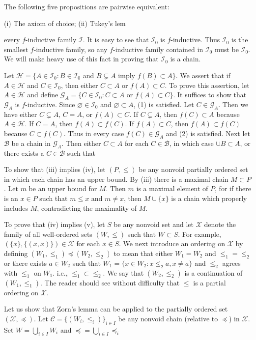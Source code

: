 The following five propositions are pairwise equivalent:

(i) The axiom of choice;
(ii) Tukey’s lem

every $f$-inductive family $\mathcal{I}$. It is easy to see that $\mathcal{I}_0$ is $f$-inductive. Thus $\mathcal{I}_0$ is the smallest $f$-inductive family, so any $f$-inductive family contained in $\mathcal{I}_0$ must be $\mathcal{I}_0$. We will make heavy use of this fact in proving that $\mathcal{I}_0$ is a chain.

Let $\mathcal{H} = \{A \in \mathcal{I}_0 : B \in \mathcal{I}_0$ and $B \subsetneq A$ imply $f(B) \subset A\}$. We assert that if $A \in \mathcal{H}$ and $C \in \mathcal{I}_0$, then either $C \subset A$ or $f(A) \subset C$. To prove this assertion, let $A \in \mathcal{H}$ and define $\mathcal{G}_A = \{C \in \mathcal{I}_0 : C \subset A$ or $f(A) \subset C\}$. It suffices to show that $\mathcal{G}_A$ is $f$-inductive. Since $\varnothing \in \mathcal{I}_0$ and $\varnothing \subset A$, (1) is satisfied. Let $C \in \mathcal{G}_A$. Then we have either $C \subsetneq A$, $C = A$, or $f(A) \subset C$. If $C \subsetneq A$, then $f(C) \subset A$ because $A \in \mathcal{H}$. If $C = A$, then $f(A) \subset f(C)$. If $f(A) \subset C$, then $f(A) \subset f(C)$ because $C \subset f(C)$. Thus in every case $f(C) \in \mathcal{G}_A$ and (2) is satisfied. Next let $\mathcal{B}$ be a chain in $\mathcal{G}_A$. Then either $C \subset A$ for each $C \in \mathcal{B}$, in which case $\cup B \subset A$, or there exists a $C \in \mathcal{B}$ such that

To show that (iii) implies (iv), let $(P, \leq)$ be any nonvoid partially ordered set in which each chain has an upper bound. By (iii) there is a maximal chain $M \subset P$. Let $m$ be an upper bound for $M$. Then $m$ is a maximal element of $P$, for if there is an $x \in P$ such that $m \leq x$ and $m \neq x$, then $M \cup \{x\}$ is a chain which properly includes $M$, contradicting the maximality of $M$.

To prove that (iv) implies (v), let $S$ be any nonvoid set and let $\mathcal{X}$ denote the family of all well-ordered sets $(W, \leq)$ such that $W \subset S$. For example, $(\{x\}, \{(x, x)\}) \in \mathcal{X}$ for each $x \in S$. We next introduce an ordering on $\mathcal{X}$ by defining $(W_1, \leq_1) \preceq (W_2, \leq_2)$ to mean that either $W_1 = W_2$ and $\leq_1 = \leq_2$ or there exists $a \in W_2$ such that $W_1 = \{x \in W_2 : x \leq_2 a, x \neq a\}$ and $\leq_2$ agrees with $\leq_1$ on $W_1$. i.e., $\leq_1 \subset \leq_2$. We say that $(W_2, \leq_2)$ is a continuation of $(W_1, \leq_1)$. The reader should see without difficulty that $\leq$ is a partial ordering on $\mathcal{X}$.

Let us show that Zorn's lemma can be applied to the partially ordered set $(\mathcal{X}, \preceq)$. Let $\mathcal{C} = \{(W_i, \leq_i)\}_{i \in I}$ be any nonvoid chain (relative to $\preceq$) in $\mathcal{X}$. Set $W = \bigcup_{i \in I} W_i$ and $\preceq = \bigcup_{i \in I} \preceq_i$